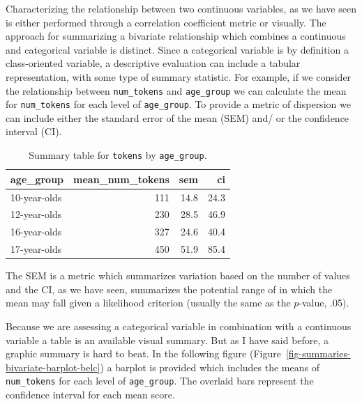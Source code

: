 \documentclass[
  letterpaper,
]{latex/krantz}
\begin{document}
Characterizing the relationship between two continuous variables, as we
have seen is either performed through a correlation coefficient metric
or visually. The approach for summarizing a bivariate relationship which
combines a continuous and categorical variable is distinct. Since a
categorical variable is by definition a class-oriented variable, a
descriptive evaluation can include a tabular representation, with some
type of summary statistic. For example, if we consider the relationship
between \texttt{num\_tokens} and \texttt{age\_group} we can calculate
the mean for \texttt{num\_tokens} for each level of \texttt{age\_group}.
To provide a metric of dispersion we can include either the standard
error of the mean (SEM) and/ or the confidence interval (CI).

\hypertarget{tbl-summarize-bivariate-cont-cat-belc}{}
\begin{table}
\caption{\label{tbl-summarize-bivariate-cont-cat-belc}Summary table for \texttt{tokens} by \texttt{age\_group}. }\tabularnewline

\centering
\begin{tabular}{lrrr}
\toprule
age\_group & mean\_num\_tokens & sem & ci\\
\midrule
10-year-olds & 111 & 14.8 & 24.3\\
12-year-olds & 230 & 28.5 & 46.9\\
16-year-olds & 327 & 24.6 & 40.4\\
17-year-olds & 450 & 51.9 & 85.4\\
\bottomrule
\end{tabular}
\end{table}

The SEM is a metric which summarizes variation based on the number of
values and the CI, as we have seen, summarizes the potential range of in
which the mean may fall given a likelihood criterion (usually the same
as the \(p\)-value, .05).

Because we are assessing a categorical variable in combination with a
continuous variable a table is an available visual summary. But as I
have said before, a graphic summary is hard to beat. In the following
figure (Figure~\ref{fig-summaries-bivariate-barplot-belc}) a barplot is
provided which includes the means of \texttt{num\_tokens} for each level
of \texttt{age\_group}. The overlaid bars represent the confidence
interval for each mean score.
\end{document}
